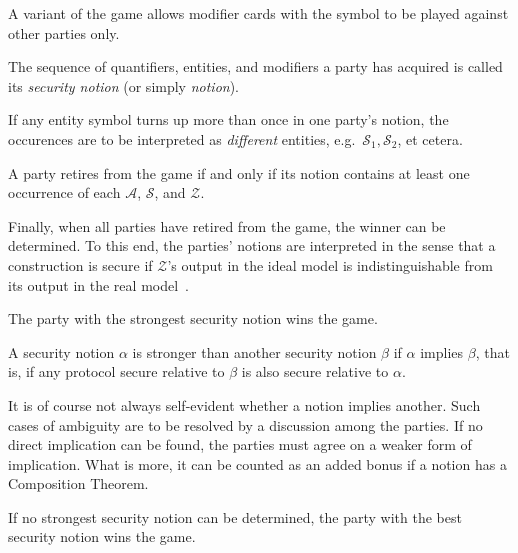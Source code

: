 \documentclass{llncs}
\begin{document}
\begin{remark}
	A variant of the game allows modifier cards with the \stopsign symbol to be played against other parties only.
\end{remark}

\begin{definition}
	The sequence of quantifiers, entities, and modifiers a party has acquired is called its \emph{security notion} (or simply \emph{notion}).
\end{definition}

\begin{theorem}
	If any entity symbol turns up more than once in one party's notion, the occurences are to be interpreted as \emph{different} entities, e.g.\ $\mathcal{S}_1, \mathcal{S}_2$, et cetera.
\end{theorem}

\begin{theorem}
	A party retires from the game if and only if its notion contains at least one occurrence of each $\mathcal{A}$, $\mathcal{S}$, and $\mathcal{Z}$.
\end{theorem}

Finally, when all parties have retired from the game, the winner can be determined. To this end, the parties' notions are interpreted in the sense that a construction is secure if $\mathcal{Z}$'s output in the ideal model is indistinguishable from its output in the real model~\cite{can01,can05,can13}.

\begin{theorem}
	The party with the strongest security notion wins the game.
\end{theorem}

A security notion $\alpha$ is stronger than another security notion $\beta$ if $\alpha$ implies $\beta$, that is, if any protocol secure relative to $\beta$ is also secure relative to $\alpha$.

It is of course not always self-evident whether a notion implies another. Such cases of ambiguity are to be resolved by a discussion among the parties. If no direct implication can be found, the parties must agree on a weaker form of implication. What is more, it can be counted as an added bonus if a notion has a Composition Theorem.

\begin{theorem}
	If no strongest security notion can be determined, the party with the best security notion wins the game.
\end{theorem}
\end{document}
